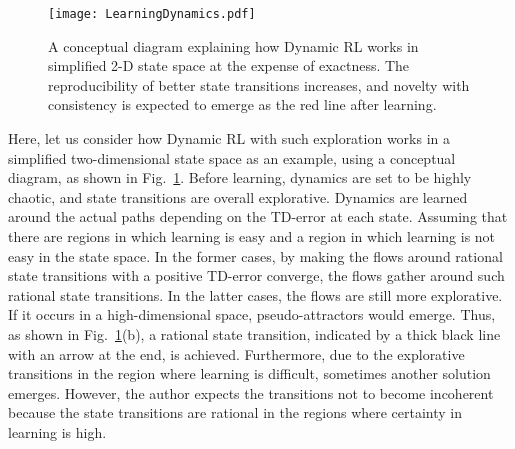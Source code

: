 \begin{figure}[t]
\centerline{\texttt{[image: LearningDynamics.pdf]}}
\caption{A conceptual diagram explaining how Dynamic RL works in simplified 2-D state space at the expense of exactness.
The reproducibility of better state transitions increases, and
novelty with consistency is expected to emerge as the red line after learning.}
\label{fig:LearningDynamics}
\end{figure}
Here, let us consider how Dynamic RL with such exploration works in a simplified two-dimensional state space as an example,
using a conceptual diagram, as shown in Fig.~\ref{fig:LearningDynamics}.
Before learning, dynamics are set to be highly chaotic, and state transitions are overall explorative.
Dynamics are learned around the actual paths depending on the TD-error at each state.
Assuming that there are regions in which learning is easy and a region in which learning is not easy in the state space.
In the former cases, by making the flows around rational state transitions with a positive TD-error converge,
the flows gather around such rational state transitions.
In the latter cases, the flows are still more explorative.
If it occurs in a high-dimensional space, pseudo-attractors would emerge.
Thus, as shown in Fig.~\ref{fig:LearningDynamics}(b),
a rational state transition, indicated by a thick black line with an arrow at the end, is achieved.
Furthermore, due to the explorative transitions in the region where learning is difficult,
sometimes another solution emerges.
However, the author expects the transitions not to become incoherent
because the state transitions are rational in the regions where certainty in learning is high.


